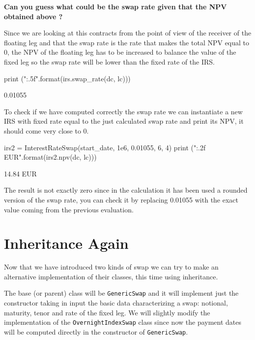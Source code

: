 \textbf{Can you guess what could be the \textbf{swap rate} given that the NPV obtained above ?}

Since we are looking at this contracts from the point of view of the receiver of the floating leg and that the swap rate is the rate that makes the total NPV equal to 0, the NPV of the floating leg has to be increased to balance the value of the fixed leg so the swap rate will be lower than the fixed rate of the IRS.

\begin{ipython}
print ("{:.5f}".format(irs.swap_rate(dc, lc)))
\end{ipython}
\begin{ioutput}
0.01055
\end{ioutput}
    
To check if we have computed correctly the swap rate we can instantiate a new IRS with fixed rate equal to the just calculated swap rate and print its NPV, it should come very close to 0.

\begin{ipython}
irs2 = InterestRateSwap(start_date, 1e6, 0.01055, 6, 4)
print ("{:.2f} EUR".format(irs2.npv(dc, lc)))
\end{ipython}
\begin{ioutput}
14.84 EUR
\end{ioutput}

The result is not exactly zero since in the calculation it has been used a rounded version of the swap rate, you can check it by replacing 0.01055 with the exact value coming from the previous evaluation. 
   
\section{Inheritance Again}
Now that we have introduced two kinds of swap we can try to make an alternative implementation of their classes, this time using inheritance.

The base (or parent) class will be \texttt{GenericSwap} and it will implement just the constructor taking in input the basic data characterizing a swap: notional, maturity, tenor and rate of the fixed leg. We will slightly modify the implementation of the \texttt{OvernightIndexSwap} class since now the payment dates will be computed directly in the constructor of \texttt{GenericSwap}.

